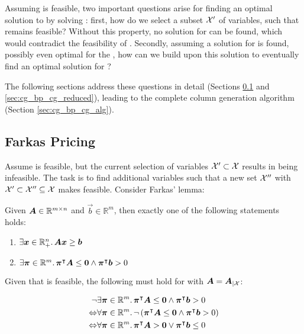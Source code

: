 Assuming \MP{} is feasible, two important questions arise for finding an optimal solution to \MP{} by solving \RMP{}: first, how do we select a subset $\mathcal{X}'$ of variables, such that \RMP{} remains feasible? Without this property, no solution for \RMP{} can be found, which would contradict the feasibility of \MP{}. Secondly, assuming a solution for \RMP{} is found, possibly even optimal for the \RMP{}, how can we build upon this solution to eventually find an optimal solution for \MP{}?

The following sections address these questions in detail (Sections \ref{sec:cg_bp_cg_farkas} and \ref{sec:cg_bp_cg_reduced}), leading to the complete column generation algorithm (Section \ref{sec:cg_bp_cg_alg}).

\subsection{Farkas Pricing \FP{}}\label{sec:cg_bp_cg_farkas}
Assume \MP{} is feasible, but the current selection of variables $\mathcal{X}' \subset \mathcal{X}$ results in \RMP{} being infeasible. The task is to find additional variables such that a new set $\mathcal{X}''$ with $\mathcal{X}' \subset \mathcal{X}'' \subseteq \mathcal{X}$ makes \RMP{} feasible. Consider Farkas' lemma:

\begin{theorem}\label{th:farkas_lemma}
Given ${\bm{A}} \in \mathbb{R}^{m \times n}$ and $\vec{b} \in \mathbb{R}^m$, then exactly one of the following statements holds:
\begin{enumerate}
	\item $\exists {\bm{x}} \in \mathbb{R}_+^n. \, {\bm{A}} {\bm{x}} \geq {\bm{b}}$
	\item $\exists {\bm{\pi}} \in \mathbb{R}^m. \, {\bm{\pi}}^\intercal {\bm{A}} \leq {\bm{0}} \land {\bm{\pi}}^\intercal {\bm{b}} > 0$
\end{enumerate}
\end{theorem}

Given that \MP{} is feasible, the following must hold for \MP{} with ${\bm{A}} = {\bm{A}}_{\vert \mathcal{X}}$:

\begin{equation}
\begin{aligned}
\neg & \exists {\bm{\pi}} \in \mathbb{R}^m. \, {\bm{\pi}}^\intercal {\bm{A}} \leq {\bm{0}} \land {\bm{\pi}}^\intercal {\bm{b}} > 0 \\
\Leftrightarrow & \forall {\bm{\pi}} \in \mathbb{R}^m. \, \neg \left( {\bm{\pi}}^\intercal {\bm{A}} \leq {\bm{0}} \land {\bm{\pi}}^\intercal {\bm{b}} > 0 \right)\\
\Leftrightarrow & \forall {\bm{\pi}} \in \mathbb{R}^m. \, {\bm{\pi}}^\intercal {\bm{A}} > {\bm{0}} \lor {\bm{\pi}}^\intercal {\bm{b}} \leq 0
\end{aligned}
\end{equation}

